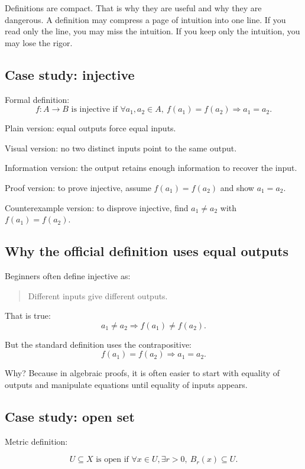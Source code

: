 \documentclass[12pt]{article}
\begin{document}
Definitions are compact. That is why they are useful and why they are dangerous. A definition may compress a page of intuition into one line. If you read only the line, you may miss the intuition. If you keep only the intuition, you may lose the rigor.

\subsection{Case study: injective}

Formal definition:
\[
f:A\to B\text{ is injective if }\forall a_1,a_2\in A,\ f(a_1)=f(a_2)\Rightarrow a_1=a_2.
\]

Plain version: equal outputs force equal inputs.

Visual version: no two distinct inputs point to the same output.

Information version: the output retains enough information to recover the input.

Proof version: to prove injective, assume $f(a_1)=f(a_2)$ and show $a_1=a_2$.

Counterexample version: to disprove injective, find $a_1\neq a_2$ with $f(a_1)=f(a_2)$.

\subsection{Why the official definition uses equal outputs}

Beginners often define injective as:

\begin{quote}
Different inputs give different outputs.
\end{quote}

That is true:
\[
a_1\neq a_2\Rightarrow f(a_1)\neq f(a_2).
\]

But the standard definition uses the contrapositive:
\[
f(a_1)=f(a_2)\Rightarrow a_1=a_2.
\]

Why? Because in algebraic proofs, it is often easier to start with equality of outputs and manipulate equations until equality of inputs appears.

\subsection{Case study: open set}

Metric definition:

\[
U\subseteq X\text{ is open if }\forall x\in U,\exists r>0,\ B_r(x)\subseteq U.
\]
\end{document}
